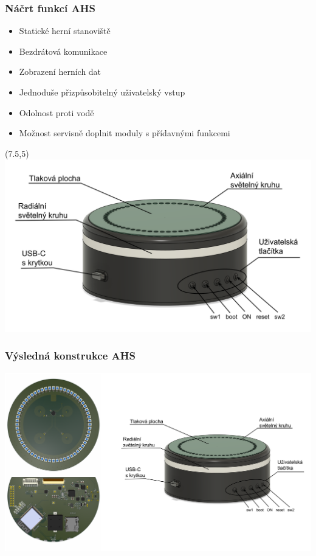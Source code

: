 \documentclass[%
  12pt,       				%
	t,                  %
	aspectratio=1610,   %
	unicode,						%
]{beamer}				    	%
\begin{document}
\begin{frame} 
	\frametitle{Náčrt funkcí AHS}
	\vspace{10mm}
	\begin{itemize}
		\item Statické herní stanoviště
		\item Bezdrátová komunikace
		\item Zobrazení herních dat
		\item Jednoduše přizpůsobitelný \newline uživatelský vstup
		\item Odolnost proti vodě
		\item Možnost servisně doplnit \newline moduly s přídavnými funkcemi 
	\end{itemize}

	\begin{textblock}{8}(7.5,5)
		\includegraphics[width=\columnwidth]{text/PraktickaCast/img/AHS-nacrt.png}
	\end{textblock}
\end{frame} 

\begin{frame} 
	\frametitle{Výsledná konstrukce AHS}
	\centering
	\includegraphics[width=\columnwidth]{text/PraktickaCast/img/AHS-kombo.png}
\end{frame} 
\end{document}
